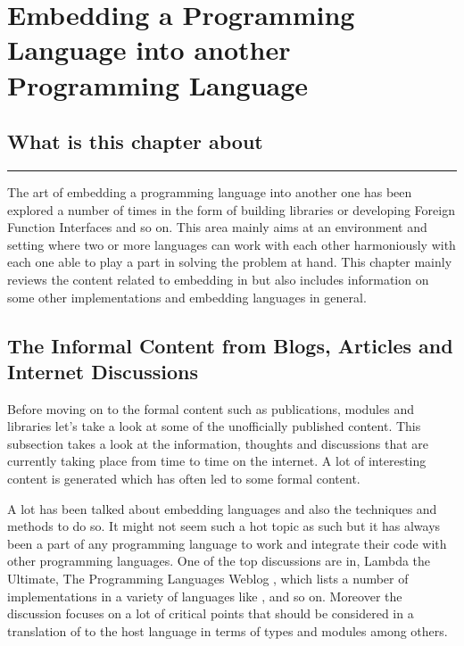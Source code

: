 \documentclass[thesis-solanki.tex]{subfiles}
\begin{document}
\chapter{Embedding a Programming Language into another Programming Language }\label{chap:embedding}


\section{What is this chapter about}

\noindent\rule{0.95\textwidth}{2.8pt}


The art of embedding a programming language into another one has been explored a number of times in the form
of building libraries or developing Foreign Function Interfaces and so on. This area mainly aims at an environment
and setting where two or more languages can work with each other harmoniously with each one able to play a part
in solving the problem at hand. This chapter mainly reviews the content related to embedding  in
 but also includes information on some other implementations and embedding languages in
general.


\section{The Informal Content from Blogs, Articles and Internet Discussions}

Before moving on to the formal content such as publications, modules and libraries let's take a look at some of the
unofficially published content.
This subsection takes a look at the information, thoughts and discussions that are currently taking place from time
to time on the internet.
A lot of interesting content is generated which has often led to some formal content.

A lot has been talked about embedding languages and also the techniques and methods to do so.
It might not seem such a hot topic as such but it has always been a part of any programming language to work and
integrate their code with other programming languages.
One of the top discussions are in, Lambda the Ultimate, The Programming Languages Weblog
\cite{website:lambda-the-ultimate},  which lists a number of  implementations in a variety of
languages like ,  \cite{racklog} and so on.
Moreover the discussion focuses on a lot of critical points that should be considered in a translation of
 to the host language in terms of types and modules among others.
\end{document}
